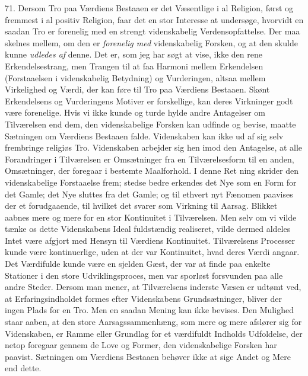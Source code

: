 \documentclass[12pt,a4paper,openany]{book}
\newcommand{\opage}[1]{\marginnote{\footnotesize\textit{[#1]}}}
\begin{document}
71. Dersom Tro paa Værdiens Bestaaen er det Væsentlige i al Religion,
først og fremmest i al positiv Religion, faar det en stor Interesse at
undersøge, hvorvidt en saadan Tro er forenelig med en strengt
videnskabelig Verdensopfattelse. Der maa skelnes mellem, om den er
\textit{forenelig med} videnskabelig Forsken, og at den skulde kunne
\textit{udledes af} denne. Det er, som jeg har søgt at vise, ikke den
rene Erkendelsestrang, men Trangen til at faa Harmoni mellem Erkendelsen
(Forstaaelsen i videnskabelig Betydning) og Vurderingen, altsaa mellem
Virkelighed og Værdi, der kan føre til Tro paa Værdiens Bestaaen. Skønt
Erkendelsens og Vurderingens Motiver er forskellige, kan deres
Virkninger godt være forenelige. Hvis vi ikke kunde og turde hylde andre
Antagelser om Tilværelsen end dem, den videnskabelige Forsken kan
udfinde og bevise, maatte Sætningen om Værdiens Bestaaen falde.
Videnskaben kan ikke ud af sig selv frembringe religiøs Tro. Videnskaben
arbejder sig hen imod den Antagelse, at alle Forandringer i Tilværelsen
er Omsætninger fra en Tilværelsesform til en anden, Omsætninger, der
foregaar i bestemte Maalforhold. I denne Ret%
\opage{166}ning skrider den videnskabelige Forstaaelse frem; stedse
bedre erkendes det Nye som en Form for det Gamle; det Nye sluttes fra
det Gamle; og til ethvert nyt Fænomen paavises der et forudgaaende, til
hvilket det svarer som Virkning til Aarsag. Blikket aabnes mere og mere
for en stor Kontinuitet i Tilværelsen. Men selv om vi vilde tænke os
dette Videnskabens Ideal fuldstændig realiseret, vilde dermed aldeles
Intet være afgjort med Hensyn til Værdiens Kontinuitet. Tilværelsens
Processer kunde være kontinuerlige, uden at der var Kontinuitet, hvad
deres Værdi angaar. Det Værdifulde kunde være en sjelden Gæst, der var
at finde paa enkelte Stationer i den store Udviklingsproces, men var
sporløst forsvunden paa alle andre Steder. Dersom man mener, at
Tilværelsens inderste Væsen er udtømt ved, at Erfaringsindholdet formes
efter Videnskabens Grundsætninger, bliver der ingen Plads for en Tro.
Men en saadan Mening kan ikke bevises. Den Mulighed staar aaben, at den
store Aarsagssammenhæng, som mere og mere afslører sig for Videnskaben,
er Ramme eller Grundlag for et værdifuldt Indholds Udfoldelse, der netop
foregaar gennem de Love og Former, den videnskabelige Forsken har
paavist. Sætningen om Værdiens Bestaaen behøver ikke at sige Andet og
Mere end dette.
\end{document}
